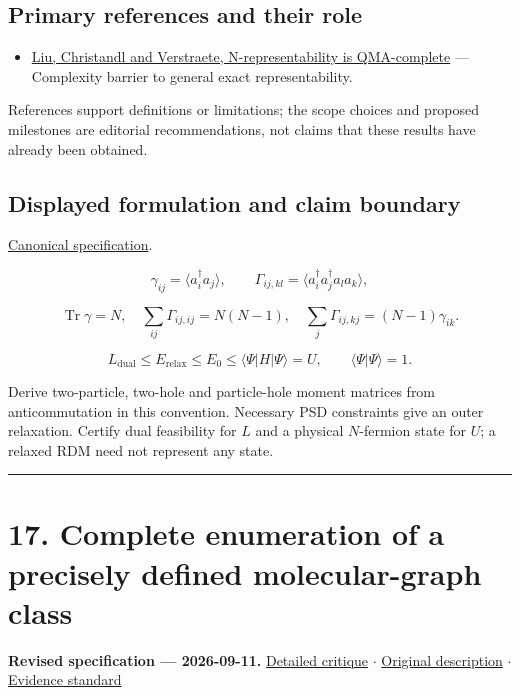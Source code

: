 \documentclass[
  11pt,
]{article}
\providecommand{\tightlist}{%
  \setlength{\itemsep}{0pt}\setlength{\parskip}{0pt}}
\begin{document}
\subsection{Primary references and their role}

\begin{itemize}
\tightlist
\item
  \href{https://arxiv.org/abs/quant-ph/0609125}{Liu, Christandl and
  Verstraete, N-representability is QMA-complete} --- Complexity barrier
  to general exact representability.
\end{itemize}

References support definitions or limitations; the scope choices and
proposed milestones are editorial recommendations, not claims that these
results have already been obtained.

\subsection{Displayed formulation and claim boundary}

\href{https://github.com/rick-stevens-ai/Pure-Thought/blob/main/PRDs/16-N-Representability-2RDM.md}{Canonical
specification}.

\[\gamma_{ij}=\langle a_i^\dagger a_j\rangle,\qquad
\Gamma_{ij,kl}=\langle a_i^\dagger a_j^\dagger a_l a_k\rangle,\]

\[\operatorname{Tr}\gamma=N,\quad
\sum_{ij}\Gamma_{ij,ij}=N(N-1),\quad
\sum_j\Gamma_{ij,kj}=(N-1)\gamma_{ik}.\]

\[L_{\mathrm{dual}}\le E_{\mathrm{relax}}\le E_0\le
\langle\Psi|H|\Psi\rangle=U,\qquad \langle\Psi|\Psi\rangle=1.\]

Derive two-particle, two-hole and particle-hole moment matrices from
anticommutation in this convention. Necessary PSD constraints give an
outer relaxation. Certify dual feasibility for \(L\) and a physical
\(N\)-fermion state for \(U\); a relaxed RDM need not represent any
state.

\begin{center}\rule{0.5\linewidth}{0.5pt}\end{center}

\section{17. Complete enumeration of a precisely defined molecular-graph
class}

\textbf{Revised specification --- 2026-09-11.}
\href{https://github.com/rick-stevens-ai/Pure-Thought/blob/main/reviews/17-Isomer-Enumeration-Molecular-Graphs.md}{Detailed
critique} \ensuremath{\cdot}
\href{https://github.com/rick-stevens-ai/Pure-Thought/blob/main/archive/original-PRDs/17-Isomer-Enumeration-Molecular-Graphs.md}{Original
description} \ensuremath{\cdot}
\href{https://github.com/rick-stevens-ai/Pure-Thought/blob/main/reviews/EVIDENCE-STANDARD.md}{Evidence
standard}
\end{document}
